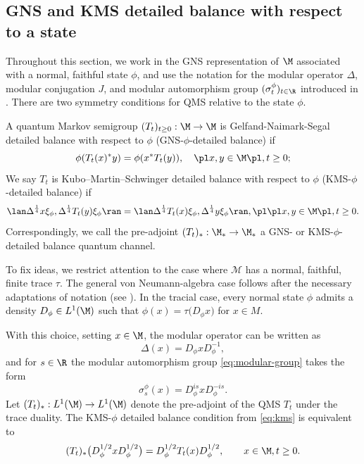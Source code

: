 \documentclass[sn-mathphys-num]{sn-jnl}
\begin{document}
\subsection{GNS and KMS detailed balance with respect to a state}\label{sec:GNSsymmetric}
Throughout this section, we work in the GNS representation of $\M$ associated with a normal,
faithful state $\phi$, and use the notation for the modular operator $\Delta$,
modular conjugation $J$, and modular automorphism group $(\sigma_t^\phi)_{t\in\R}$
introduced in .
There are two symmetry conditions \cite[Definition~4.1]{Gao_Junge_LaRacuente_Li_2025}\label{defi:GNS} for QMS relative to the state $\phi$.
\medskip

\begin{definition}\label{def:GNS}
A quantum Markov semigroup $(T_t)_{t\geq0}:\M \to \M$ is Gelfand-Naimark-Segal detailed balance with respect to $\phi$ (GNS-$\phi$-detailed balance) if \[\phi(T_t(x)^*y)=\phi(x^*T_t(y)), \quad   \pl x,y\in \M\pl,t\geq 0; \]
We say $T_t$ is Kubo--Martin--Schwinger detailed balance with respect to $\phi$ (KMS-$\phi$-detailed balance) if
\begin{equation}\label{eq:kms}\lan \Delta^{\frac{1}{4}} x\xi_\phi, \Delta^{\frac{1}{4}}T_t(y)\xi_\phi \ran=\lan \Delta^{\frac{1}{4}} T_t(x)\xi_\phi, \Delta^{\frac{1}{4}}y\xi_\phi \ran, \pl   \pl x,y\in \M\pl,t\geq 0. \end{equation}
Correspondingly, we call the pre-adjoint $(T_{t})_*:\M_*\to \M_*$ a GNS- or KMS-$\phi$-detailed balance quantum channel.
\end{definition}

To fix ideas, we restrict attention to the case where $\mathcal{M}$ has a normal, faithful, finite trace $\tau$. The general von Neumann-algebra case follows after the necessary adaptations of notation (see ).
In the tracial case, every normal state $\phi$ admits a density
$D_\phi\in L^{1}(\M)$ such that $\phi(x)=\tau  \bigl(D_\phi x\bigr)$ for $x\in M$.

With this choice, setting $x\in \M$, the modular operator can be written as
\[\Delta(x)=D_\phi x D_\phi^{-1},\]
and for $s\in\R$ the modular automorphism group \cref{eq:modular-group} takes the form
\[
  \sigma^{\phi}_{s}(x)=D_\phi^{is} x D_\phi^{-is}.
\]
Let $(T_t)_*:L^{1}(\M)\to L^{1}(\M)$ denote the pre-adjoint of the QMS
$T_t$ under the trace duality.  The KMS-$\phi$ detailed balance condition
from \cref{eq:kms} is equivalent to
\begin{equation}\label{eq:kms-2}
  (T_t)_*    \bigl(D_\phi^{1/2}xD_\phi^{1/2}\bigr)
   =
  D_\phi^{1/2} T_t(x) D_\phi^{1/2},
  \qquad x\in\M, t\ge0.
\end{equation}
\end{document}
